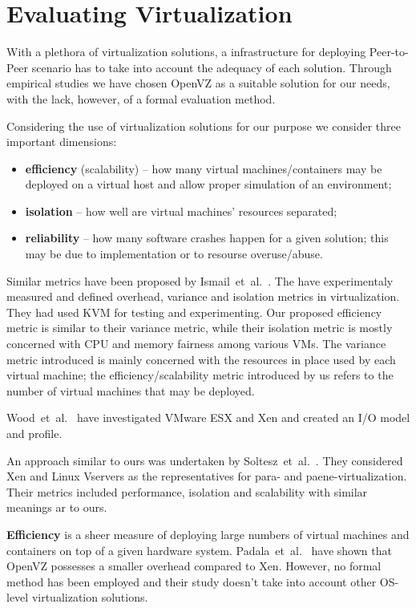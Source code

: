 \section{Evaluating Virtualization}

With a plethora of virtualization solutions, a infrastructure for deploying
Peer-to-Peer scenario has to take into account the adequacy of each solution.
Through empirical studies we have chosen OpenVZ as a suitable solution for our
needs, with the lack, however, of a formal evaluation method.

Considering the use of virtualization solutions for our purpose we consider
three important dimensions:

\begin{itemize}
  \item \textbf{efficiency} (scalability) -- how many virtual
  machines/containers may be deployed on a virtual host and allow proper
  simulation of an environment;
  \item \textbf{isolation} -- how well are virtual machines' resources
  separated;
  \item \textbf{reliability} -- how many software crashes happen for a given
  solution; this may be due to implementation or to resourse overuse/abuse.
\end{itemize}

Similar metrics have been proposed by Ismail~et~al.~\cite{virt-metrics}. The
have experimentaly measured and defined overhead, variance and isolation
metrics in virtualization. They had used KVM for testing and experimenting.
Our proposed efficiency metric is similar to their variance metric, while
their isolation metric is mostly concerned with CPU and memory fairness among
various VMs. The variance metric introduced is mainly concerned with the
resources in place used by each virtual machine; the efficiency/scalability
metric introduced by us refers to the number of virtual machines that may be
deployed.

Wood~et~al.~\cite{virt-prof-model} have investigated VMware ESX and Xen and
created an I/O model and profile.

An approach similar to ours was undertaken by
Soltesz~et~al.~\cite{virt-doppel}. They considered Xen and Linux Vservers as
the representatives for para- and paene-virtualization. Their metrics included
performance, isolation and scalability with similar meanings ar to ours.

\textbf{Efficiency} is a sheer measure of deploying large numbers of virtual
machines and containers on top of a given hardware system.
Padala~et~al.~\cite{eval-virt-performance} have shown that OpenVZ possesses a
smaller overhead compared to Xen. However, no formal method has been employed
and their study doesn't take into account other OS-level virtualization
solutions.

